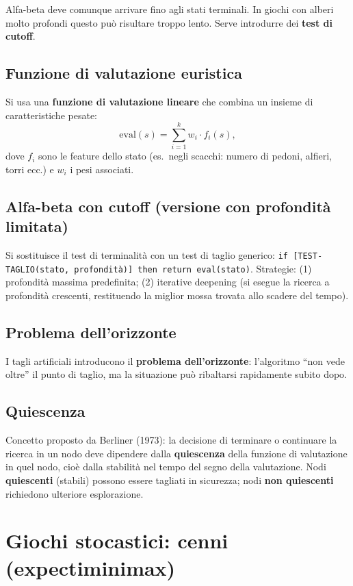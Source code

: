 \documentclass[11pt,a4paper]{report}
\begin{document}
Alfa-beta deve comunque arrivare fino agli stati terminali. In giochi con alberi molto profondi questo può risultare troppo lento. Serve introdurre dei \textbf{test di cutoff}.

\subsection*{Funzione di valutazione euristica}

Si usa una \textbf{funzione di valutazione lineare} che combina un insieme di caratteristiche pesate:
\[
\text{eval}(s) = \sum_{i=1}^{k} w_i \cdot f_i(s),
\]
dove $f_i$ sono le feature dello stato (es.\ negli scacchi: numero di pedoni, alfieri, torri ecc.) e $w_i$ i pesi associati.

\subsection*{Alfa-beta con cutoff (versione con profondità limitata)}

Si sostituisce il test di terminalità con un test di taglio generico: \texttt{if [TEST-TAGLIO(stato, profondità)] then return eval(stato)}. Strategie: (1) profondità massima predefinita; (2) iterative deepening (si esegue la ricerca a profondità crescenti, restituendo la miglior mossa trovata allo scadere del tempo).

\subsection*{Problema dell'orizzonte}

I tagli artificiali introducono il \textbf{problema dell'orizzonte}: l'algoritmo ``non vede oltre'' il punto di taglio, ma la situazione può ribaltarsi rapidamente subito dopo.

\subsection*{Quiescenza}

Concetto proposto da Berliner (1973): la decisione di terminare o continuare la ricerca in un nodo deve dipendere dalla \textbf{quiescenza} della funzione di valutazione in quel nodo, cioè dalla stabilità nel tempo del segno della valutazione. Nodi \textbf{quiescenti} (stabili) possono essere tagliati in sicurezza; nodi \textbf{non quiescenti} richiedono ulteriore esplorazione.

\section{Giochi stocastici: cenni (expectiminimax)}
\end{document}
